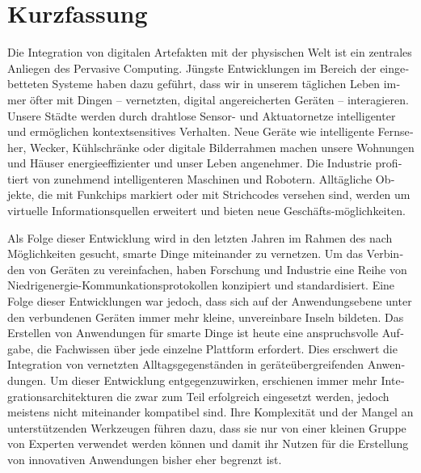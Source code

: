 \chapter*{Kurzfassung}
\begin{otherlanguage}{ngerman}
Die Integration von digitalen Artefakten mit der physischen Welt ist ein zentrales Anliegen des Pervasive Computing. J\"{u}ngste Entwicklungen im Bereich der eingebetteten Systeme haben dazu gef\"{u}hrt, dass wir in unserem t\"{a}glichen Leben immer \"{o}fter mit  Dingen -- vernetzten, digital angereicherten Ger\"{a}ten -- interagieren. Unsere St\"{a}dte werden durch drahtlose Sensor- und Aktuatornetze intelligenter und erm\"{o}glichen kontextsensitives Verhalten. Neue Ger\"{a}te wie intelligente Fernseher, Wecker, K\"{u}hlschr\"{a}nke oder digitale Bilderrahmen machen unsere Wohnungen und H\"{a}user energieeffizienter und unser Leben angenehmer. Die Industrie profitiert von zunehmend intelligenteren Maschinen und Robotern. Allt\"{a}gliche Objekte, die mit Funkchips markiert oder mit Strichcodes versehen sind, werden um virtuelle Informationsquellen erweitert und bieten neue Gesch\"{a}fts-m\"{o}glichkeiten.

Als Folge dieser Entwicklung wird in den letzten Jahren im Rahmen des  nach M\"{o}glichkeiten gesucht, smarte Dinge miteinander zu vernetzen. Um das Verbinden von Ger\"{a}ten zu vereinfachen, haben Forschung und Industrie eine Reihe von Niedrigenergie-Kommunkationsprotokollen konzipiert und standardisiert. Eine Folge dieser Entwicklungen war jedoch, dass sich auf der Anwendungsebene unter den verbundenen Ger\"{a}ten immer mehr kleine, unvereinbare Inseln bildeten. Das Erstellen von Anwendungen f\"{u}r smarte Dinge ist heute eine anspruchsvolle Aufgabe, die Fachwissen \"{u}ber jede einzelne Plattform erfordert. Dies erschwert die Integration von vernetzten Alltagsgegenst\"{a}nden in ger\"{a}te\"{u}bergreifenden Anwendungen. Um dieser Entwicklung entgegenzuwirken, erschienen immer mehr Integrationsarchitekturen die zwar zum Teil erfolgreich eingesetzt werden, jedoch meistens nicht miteinander kompatibel sind. Ihre Komplexit\"{a}t und der Mangel an unterst\"{u}tzenden Werkzeugen f\"{u}hren dazu, dass sie nur von einer kleinen Gruppe von Experten verwendet werden k\"{o}nnen und damit ihr Nutzen f\"{u}r die Erstellung von innovativen Anwendungen bisher eher begrenzt ist.


\end{otherlanguage}
